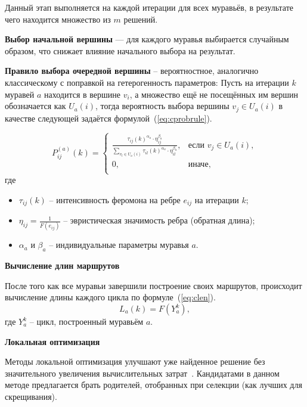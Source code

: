Данный этап выполняется на каждой итерации для всех муравьёв, в результате чего находится множество из $m$ решений.

\textbf{Выбор начальной вершины} — для каждого муравья выбирается случайным образом, что снижает влияние начального выбора на результат.

\textbf{Правило выбора очередной вершины} -- вероятностное, аналогично классическому с поправкой на гетерогенность параметров: Пусть на итерации $k$ муравей $a$ находится в вершине $v_i$, а множество ещё не посещённых им вершин обозначается как $U_a(i)$, тогда вероятность выбора вершины $v_j \in U_a(i)$ в качестве следующей задаётся формулой~(\ref{eq:cprobrule}).

\begin{equation}
	P_{ij}^{(a)}(k) =
	\begin{cases}
		\displaystyle \frac{\tau_{ij}(k)^{\alpha_a} \cdot \eta_{ij}^{\beta_a}}
		{\sum\limits_{v_l \in U_a(i)} \tau_{il}(k)^{\alpha_a} \cdot \eta_{il}^{\beta_a}}, & \text{если } v_j \in U_a(i), \\
		0, & \text{иначе}, \\
	\end{cases}
	\label{eq:cprobrule}
\end{equation}
где
\begin{itemize}
	\item $\tau_{ij}(k)$ -- интенсивность феромона на ребре $e_{ij}$ на итерации $k$;
	\item $\eta_{ij} = \frac{1}{F(e_{ij})}$ -- эвристическая значимость ребра (обратная длина);
	\item $\alpha_a$ и $\beta_a$ -- индивидуальные параметры муравья $a$.
\end{itemize}

\textbf{Вычисление длин маршрутов}

После того как все муравьи завершили построение своих маршрутов, происходит вычисление длины каждого цикла по формуле~(\ref{eq:clen}).
\begin{equation}
	L_a(k) = F(Y^k_a),
	\label{eq:clen}
\end{equation}
где $Y^k_a$ -- цикл, построенный муравьём $a$.

\textbf{Локальная оптимизация}

Методы локальной оптимизация улучшают уже найденное решение без значительного увеличения вычислительных затрат~\cite{mmas}. Кандидатами в данном методе предлагается брать родителей, отобранных при селекции (как лучших для скрещивания).

